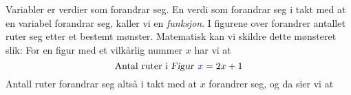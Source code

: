 





\newpage
\section{\fintro}
Variabler er verdier som forandrar seg. En verdi som forandrar seg i takt med at en variabel forandrar seg, kaller vi en \textit{funksjon}.\vsk
{}
I figurene over forandrer antallet ruter seg etter et bestemt mønster. Matematisk kan vi skildre dette mønsteret slik:
For en figur med et vilkårlig nummer $ x $ har vi at
\[ \text{Antal ruter i \textsl{Figur }}{\color{blue}x}=2{\color{blue}x}+1 \]
Antall ruter forandrar seg altså i takt med at $ x $ forandrer seg, og da sier vi at\regv
\st{}\regv


